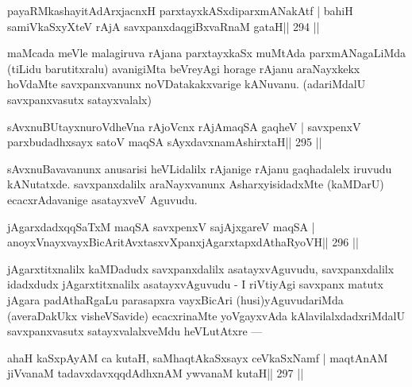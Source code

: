 
\begin{shl}
payaRMkashayitAdArxjacnxH parxtayxkASxdiparxmANakAtf |
bahiH samiVkaSxyXteV rAjA savxpanxdaqgiBxvaRnaM gataH\hfill || 294 ||
\end{shl}

\begin{artha}
maMcada meVle malagiruva rAjana parxtayxkaSx muMtAda parxmANagaLiMda (tiLidu barutitxralu) avanigiMta beVreyAgi horage rAjanu araNayxkekx hoVdaMte savxpanxvanunx noVDatakakxvarige kANuvanu. (adariMdalU savxpanxvasutx satayxvalalx)
\end{artha}


\begin{shl}
sAvxnuBUtayxnuroVdheVna rAjoVcnx rAjA\s maqSA gaqheV |
savxpenxV parxbudadhxsayx satoV maqSA sAyxdavxnamAshirxtaH\hfill || 295 ||
\end{shl}

\begin{artha}
sAvxnuBavavanunx anusarisi heVLidalilx rAjanige rAjanu gaqhadalelx iruvudu kANutatxde. savxpanxdalilx araNayxvanunx AsharxyisidadxMte (kaMDarU) ecacxrAdavanige asatayxveV Aguvudu.
\end{artha}

\begin{shl}
jAgarxdadxqqSaTxM maqSA savxpenxV sajAjxgareV maqSA |
anoyxVnayxvayxBicAritAvxtasxvXpanxjAgarxtapxdAthaRyoVH\hfill || 296 ||
\end{shl}

\begin{artha}
jAgarxtitxnalilx kaMDadudx savxpanxdalilx asatayxvAguvudu, 
savxpanxdalilx idadxdudx jAgarxtitxnalilx asatayxvAguvudu - I riVtiyAgi savxpanx matutx jAgara padAthaRgaLu parasapxra vayxBicAri (husi)yAguvudariMda (averaDakUkx visheVSavide) ecacxrinaMte yoVgayxvAda kAlavilalxdadxriMdalU savxpanxvasutx satayxvalalxveMdu heVLutAtxre  {\rm ---} 
\end{artha}

\begin{shl}
ahaH kaSxpAyAM ca kutaH, saMhaqtAkaSxsayx ceVkaSxNamf |
maqtAnAM jiVvanaM tadavxdavxqqdAdhxnAM ywvanaM kutaH\hfill || 297 ||
\end{shl}

